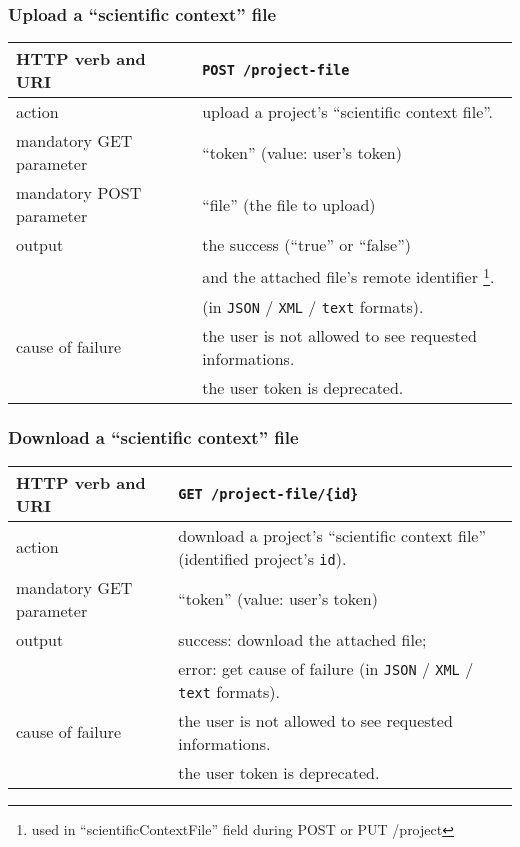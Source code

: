 \subsubsection{Upload a ``scientific context'' file}
\begin{tabular}{ | l | l | }
	\hline
	HTTP verb and URI & \texttt{POST /project-file} \\
	\hline
	action & upload a project's ``scientific context file''. \\
	\hline
	mandatory GET parameter & ``token'' (value: user's token) \\
	\hline
	mandatory POST parameter & ``file'' (the file to upload) \\
	\hline
	output & the success (``true'' or ``false'')  \\
	\space & and the attached file's remote identifier \footnote{used in ``scientificContextFile'' field during POST or PUT /project}.  \\
	\space & (in \texttt{JSON} / \texttt{XML} / \texttt{text} formats). \\
	\hline
	cause of failure & the user is not allowed to see requested informations. \\
	\space & the user token is deprecated. \\
	\hline
\end{tabular}
\newline

\subsubsection{Download a ``scientific context'' file}
\begin{tabular}{ | l | l | }
	\hline
	HTTP verb and URI & \texttt{GET /project-file/\{id\}} \\
	\hline
	action & download a project's ``scientific context file'' (identified \via project's \texttt{id}). \\
	\hline
	mandatory GET parameter & ``token'' (value: user's token) \\
	\hline
	output & success: download the attached file; \\
	\space & error: get cause of failure (in \texttt{JSON} / \texttt{XML} / \texttt{text} formats). \\
	\hline
	cause of failure & the user is not allowed to see requested informations. \\
	\space & the user token is deprecated. \\
	\hline
\end{tabular}
\newline

